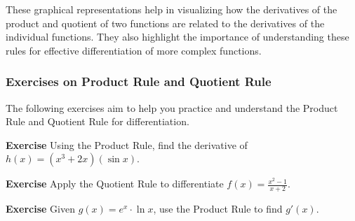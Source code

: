 \documentclass[a4paper,12pt]{book}
\newenvironment{exercise}[1][]
  {\par\medskip\noindent\textbf{Exercise #1} \rmfamily}
  {\medskip}
\begin{document}
\begin{center}
\end{center}

These graphical representations help in visualizing how the derivatives of the product and quotient of two functions are related to the derivatives of the individual functions. They also highlight the importance of understanding these rules for effective differentiation of more complex functions.

\subsubsection*{Exercises on Product Rule and Quotient Rule}

The following exercises aim to help you practice and understand the Product Rule and Quotient Rule for differentiation.

\begin{exercise}
Using the Product Rule, find the derivative of \( h(x) = (x^3 + 2x)(\sin x) \).
\end{exercise}

\begin{exercise}
Apply the Quotient Rule to differentiate \( f(x) = \frac{x^2 - 1}{x + 2} \).
\end{exercise}

\begin{exercise}
Given \( g(x) = e^x \cdot \ln x \), use the Product Rule to find \( g'(x) \).
\end{exercise}
\end{document}

